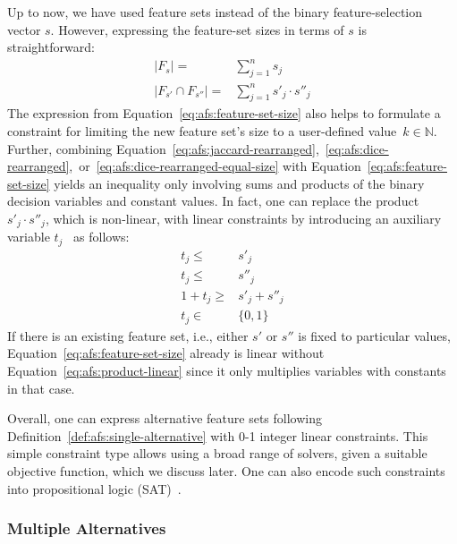 \documentclass{article}
\theoremstyle{definition}
\begin{document}
Up to now, we have used feature sets instead of the binary feature-selection vector $s$.
However, expressing the feature-set sizes in terms of $s$ is straightforward:
%
\begin{equation}
	\begin{aligned}
		|F_s| =& \sum_{j=1}^n s_j \\
		|F_{s'} \cap F_{s''}| =& \sum_{j=1}^n s'_j \cdot s''_j
	\end{aligned}
	\label{eq:afs:feature-set-size}
\end{equation}
%
The expression from Equation~\ref{eq:afs:feature-set-size} also helps to formulate a constraint for limiting the new feature set's size to a user-defined value~$k \in \mathbb{N}$.
Further, combining Equation~\ref{eq:afs:jaccard-rearranged},~\ref{eq:afs:dice-rearranged},~or~\ref{eq:afs:dice-rearranged-equal-size} with Equation~\ref{eq:afs:feature-set-size} yields an inequality only involving sums and products of the binary decision variables and constant values.
In fact, one can replace the product $s'_j \cdot s''_j$, which is non-linear, with linear constraints by introducing an auxiliary variable $t_j$~\cite{mosek2022modeling} as follows:
%
\begin{equation}
	\begin{aligned}
		t_j \leq& s'_j \\
		t_j \leq& s''_j \\
		1 + t_j \geq& s'_j + s''_j \\
		t_j \in& \{0,1\}
	\end{aligned}
	\label{eq:afs:product-linear}
\end{equation}
%
If there is an existing feature set, i.e., either $s'$ or $s''$ is fixed to particular values, Equation~\ref{eq:afs:feature-set-size} already is linear without Equation~\ref{eq:afs:product-linear} since it only multiplies variables with constants in that case.

Overall, one can express alternative feature sets following Definition~\ref{def:afs:single-alternative} with 0-1 integer linear constraints.
This simple constraint type allows using a broad range of solvers, given a suitable objective function, which we discuss later.
One can also encode such constraints into propositional logic (SAT)~\cite{ulrich2022selecting}.

\subsubsection{Multiple Alternatives}
\label{sec:afs:approach:constraints:multiple}
\end{document}
